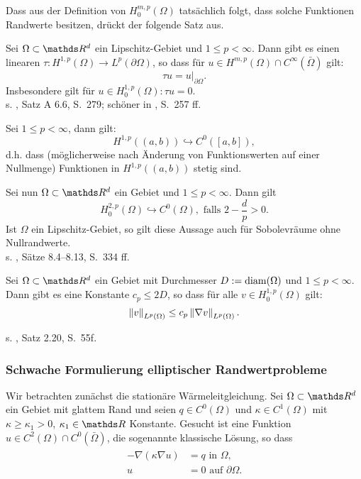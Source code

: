 Dass aus der Definition von $H_0^{m,p}(\Omega)$ tatsächlich folgt, dass solche Funktionen Randwerte besitzen, drückt der folgende Satz aus.

Sei $\Omega\subset \R^d$ ein Lipschitz-Gebiet und $1\le p<\infty$.
Dann gibt es einen linearen  $\tau: H^{1,p}(\Omega) \to L^p(\partial\Omega)$, so dass für $u\in H^{m,p}(\Omega)\cap C^\infty(\bar{\Omega})$ gilt:
\[
\tau u = u|_{\partial\Omega}.
\]
Insbesondere gilt für $u\in H_0^{1,p}(\Omega): \tau u = 0$.\\

 s. \cite{Alt06}, Satz A 6.6, S.~279; sch\"oner in \cite{Evans02}, S.~257 ff.

Sei $1\le p<\infty$, dann gilt:
\[
H^{1,p}((a,b)) \hookrightarrow C^0([a,b]),
\]
d.h. dass (möglicherweise nach Änderung von Funktionswerten auf einer Nullmenge) Funktionen in $H^{1,p}((a,b))$ stetig sind.

Sei nun $\Omega\subset \R^d$ ein Gebiet und $1\le p<\infty$. 
Dann gilt 
\[
H_0^{2,p}(\Omega) \hookrightarrow C^0(\Omega), \text{ falls } 2-\frac{d}{p} > 0.
\]
Ist $\Omega$ ein Lipschitz-Gebiet, so gilt diese Aussage auch für Sobolevräume ohne Nullrandwerte.\\

 s. \cite{Alt06}, S\"{a}tze 8.4--8.13, S.~334 ff.

Sei $\Omega\subset \R^d$ ein Gebiet mit Durchmesser $D:=\operatorname{diam}(\Omega)$ und $1\le p <\infty$.
Dann gibt es eine Konstante $c_p\le 2D$, so dass für alle $v\in H_0^{1,p}(\Omega)$ gilt:
\[
\left\Vert v\right\Vert_{L^p(\Omega)}  \le c_p \left\Vert\nabla v\right\Vert_{L^p(\Omega)}.
\]

 s. \cite{Dziuk10}, Satz 2.20, S.~55f.

\subsubsection{Schwache Formulierung elliptischer Randwertprobleme}
Wir betrachten zunächst die stationäre Wärmeleitgleichung.
Sei $\Omega\subset \R^d$ ein Gebiet mit glattem Rand und seien $q\in C^0(\Omega)$ und $\kappa\in C^1(\Omega)$ mit $\kappa\ge \kappa_1>0$, $\kappa_1\in \R$ Konstante.
Gesucht ist eine Funktion $u\in C^2(\Omega)\cap C^0(\bar{\Omega})$, die sogenannte klassische Lösung, so dass
\begin{align}
\begin{split}
-\nabla (\kappa \nabla u) &= q \text{ in } \Omega,\\
u &= 0 \text{ auf } \partial\Omega. 
\end{split}
\end{align}

